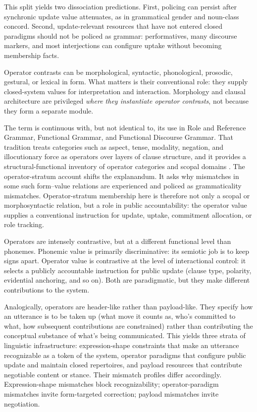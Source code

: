 \documentclass[12pt,letterpaper]{article}
\begin{document}
This split yields two dissociation predictions. First, policing can persist after synchronic update value attenuates, as in grammatical gender and noun-class concord. Second, update-relevant resources that have not entered closed paradigms should not be policed as grammar: performatives, many discourse markers, and most interjections can configure uptake without becoming membership facts.

Operator contrasts can be morphological, syntactic, phonological, prosodic, gestural, or lexical in form. What matters is their conventional role: they supply closed-system values for interpretation and interaction. Morphology and clausal architecture are privileged \emph{where they instantiate operator contrasts}, not because they form a separate module.

The term  is continuous with, but not identical to, its use in Role and Reference Grammar, Functional Grammar, and Functional Discourse Grammar. That tradition treats categories such as aspect, tense, modality, negation, and illocutionary force as operators over layers of clause structure, and it provides a structural-functional inventory of operator categories and scopal domains \citep{hengeveld1989layers,vanvalinlapolla1997syntax,vanvalin2005interface,hengeveldmackenzie2008fdg,bentleyetal2023rrg}. The operator-stratum account shifts the explanandum. It asks why mismatches in some such form--value relations are experienced and policed as grammaticality mismatches. Operator-stratum membership here is therefore not only a scopal or morphosyntactic relation, but a role in public accountability: the operator value supplies a conventional instruction for update, uptake, commitment allocation, or role tracking.

Operators are intensely contrastive, but at a different functional level than phonemes. Phonemic value is primarily discriminative: its semiotic job is to keep signs apart. Operator value is contrastive at the level of interactional control: it selects a publicly accountable instruction for public update (clause type, polarity, evidential anchoring, and so on). Both are paradigmatic, but they make different contributions to the system.

Analogically, operators are header-like rather than payload-like. They specify how an utterance is to be taken up (what move it counts as, who's committed to what, how subsequent contributions are constrained) rather than contributing the conceptual substance of what's being communicated. This yields three strata of linguistic infrastructure: expression-shape constraints that make an utterance recognizable as a token of the system, operator paradigms that configure public update and maintain closed repertoires, and payload resources that contribute negotiable content or stance. Their mismatch profiles differ accordingly. Expression-shape mismatches block recognizability; operator-paradigm mismatches invite form-targeted correction; payload mismatches invite negotiation.
\end{document}
